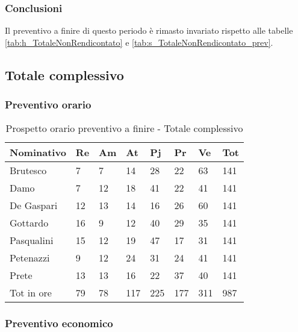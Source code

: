 	\subsubsection{Conclusioni} Il preventivo a finire di questo periodo è rimasto invariato rispetto alle tabelle \ref{tab:h_TotaleNonRendicontato} e \ref{tab:s_TotaleNonRendicontato_prev}. 

	\newpage
	\subsection{Totale complessivo}
		\subsubsection{Preventivo orario}
					\begin{table}[H] \begin{center} \begin{tabular}{llllllll}
					\toprule
					\textbf{Nominativo}	&	\textbf{Re}	&	\textbf{Am}	&	\textbf{At}	&	\textbf{Pj}	&	\textbf{Pr}	&	\textbf{Ve}	&	\textbf{Tot}	 \\
					\midrule
					Brutesco	&	7		&	7		&	14		&	28		&	22		&	63		&	141	\\
					Damo	&	7		&	12		&	18		&	41		&	22		&	41		&	141	\\
					De Gaspari	&	12		&	13		&	14		&	16		&	26		&	60		&	141	\\
					Gottardo	&	16		&	9		&	12		&	40		&	29		&	35		&	141	\\
					Pasqualini	&	15		&	12		&	19		&	47		&	17		&	31		&	141	\\
					Petenazzi	&	9		&	12		&	24		&	31		&	24		&	41		&	141	\\
					Prete	&	13		&	13		&	16		&	22		&	37		&	40		&	141	\\
					\midrule																					
					Tot in ore	&	79		&	78		&	117		&	225		&	177		&	311		&	987	\\
					\bottomrule
					\end{tabular} \end{center} \caption{Prospetto orario preventivo a finire -
					Totale complessivo
					} \end{table}
		\subsubsection{Preventivo economico}

